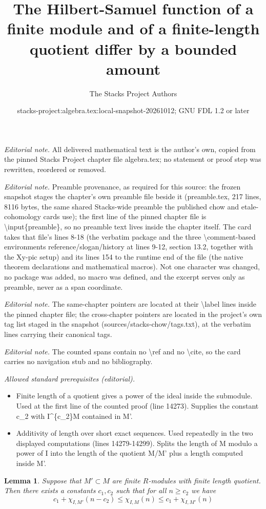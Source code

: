 \documentclass[10pt,a4paper]{amsart}
\title{The Hilbert-Samuel function of a finite module and of a finite-length quotient differ by a bounded amount}
\author{The Stacks Project Authors}
\date{stacks-project:algebra.tex:local-snapshot-20261012; GNU FDL 1.2 or later}
\theoremstyle{plain}
\newtheorem{lemma}[subsection]{Lemma}
\theoremstyle{definition}
\theoremstyle{remark}
\numberwithin{equation}{subsection}
\begin{document}
\maketitle
\noindent\textit{Editorial note.} All delivered mathematical text is the author's own, copied from the pinned Stacks Project chapter file algebra.tex; no statement or proof step was rewritten, reordered or removed.\par\medskip
\noindent\textit{Editorial note.} Preamble provenance, as required for this source: the frozen snapshot stages the chapter's own preamble file beside it (preamble.tex, 217 lines, 8116 bytes, the same shared Stacks-wide preamble the published chow and etale-cohomology cards use); the first line of the pinned chapter file is \textbackslash{}input\{preamble\}, so no preamble text lives inside the chapter itself. The card takes that file's lines 8-18 (the verbatim package and the three \textbackslash{}comment-based environments reference/slogan/history at lines 9-12, section 13.2, together with the Xy-pic setup) and its lines 154 to the runtime end of the file (the native theorem declarations and mathematical macros). Not one character was changed, no package was added, no macro was defined, and the excerpt serves only as preamble, never as a span coordinate.\par\medskip
\noindent\textit{Editorial note.} The same-chapter pointers are located at their \textbackslash{}label lines inside the pinned chapter file; the cross-chapter pointers are located in the project's own tag list staged in the snapshot (sources/stacks-chow/tags.txt), at the verbatim lines carrying their canonical tags.\par\medskip
\noindent\textit{Editorial note.} The counted spans contain no \textbackslash{}ref and no \textbackslash{}cite, so the card carries no navigation stub and no bibliography.\par\medskip
\noindent\textit{Allowed standard prerequisites (editorial).}\begin{itemize}
\item Finite length of a quotient gives a power of the ideal inside the submodule. Used at the first line of the counted proof (line 14273). Supplies the constant c\_2 with I\textasciicircum{}\{c\_2\}M contained in M'.
\item Additivity of length over short exact sequences. Used repeatedly in the two displayed computations (lines 14279-14299). Splits the length of M modulo a power of I into the length of the quotient M/M' plus a length computed inside M'.
\end{itemize}\medskip
\begin{lemma}
\label{lemma-differ-finite}
Suppose that $M' \subset M$ are finite $R$-modules
with finite length quotient. Then there exists a
constants $c_1, c_2$ such that for all $n \geq c_2$ we have
$$
c_1 + \chi_{I, M'}(n - c_2) \leq \chi_{I, M}(n) \leq
c_1 + \chi_{I, M'}(n)
$$
\end{lemma}
\end{document}
